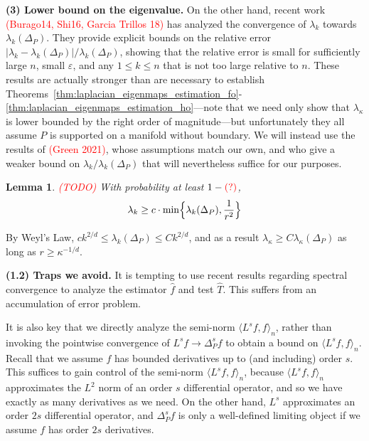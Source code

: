\documentclass{article}
\newcommand{\1}{\mathbf{1}}
\newcommand{\Leb}{L}
\newcommand{\dotp}[2]{\langle #1, #2 \rangle}
\newcommand{\wh}[1]{\widehat{#1}}
\theoremstyle{alden}
\theoremstyle{aldenthm}
\newtheorem{lemma}{Lemma}
\theoremstyle{definition}
\theoremstyle{remark}
\begin{document}
\textbf{(3) Lower bound on the eigenvalue.} On the other hand, recent work \textcolor{red}{(Burago14, Shi16, Garcia Trillos 18)} has analyzed the convergence of $\lambda_{k}$ towards $\lambda_{k}(\Delta_P)$. They provide explicit bounds on the relative error $|\lambda_{k} - \lambda_{k}(\Delta_P)|/\lambda_{k}(\Delta_P)$, showing that the relative error is small for sufficiently large $n$, small $\varepsilon$, and any $1 \leq k \leq n$ that is not too large relative to $n$. These results are actually stronger than are necessary to establish Theorems~\ref{thm:laplacian_eigenmaps_estimation_fo}-\ref{thm:laplacian_eigenmaps_estimation_ho}---note that we need only show that $\lambda_{\kappa}$ is lower bounded by the right order of magnitude---but unfortunately they all assume $P$ is supported on a manifold without boundary. We will instead use the results of \textcolor{red}{(Green 2021)}, whose assumptions match our own, and who give a weaker bound on $\lambda_k/\lambda_k(\Delta_P)$ that will nevertheless suffice for our purposes. 

\begin{lemma}
	\textcolor{red}{(TODO)}
	With probability at least $1 - \textcolor{red}{(?)}$,
	\begin{equation*}
	\lambda_k \geq c \cdot \min\Bigl\{\lambda_k(\Delta_P), \frac{1}{r^{2}} \Bigr\}
	\end{equation*}
\end{lemma}
By Weyl's Law, $c k^{2/d} \leq \lambda_{k}(\Delta_P) \leq Ck^{2/d}$, and as a result $\lambda_{\kappa} \geq C\lambda_{\kappa}(\Delta_P)$ as long as $r \geq \kappa^{-1/d}$. 

\textbf{(1.2) Traps we avoid.} It is tempting to use recent results regarding spectral convergence to analyze the estimator $\wh{f}$ and test $\wh{T}$. This suffers from an accumulation of error problem. 

It is also key that we directly analyze the semi-norm $\dotp{L^s f}{f}_n$, rather than invoking the pointwise convergence of $L^{s}f \to \Delta_P^{s}f$ to obtain a bound on $\dotp{L^s f}{f}_n$. Recall that we assume $f$ has bounded derivatives up to (and including) order $s$. This suffices to gain control of the semi-norm $\dotp{L^s f}{f}_n$, because $\dotp{L^s f}{f}_n$ approximates the $\Leb^2$ norm of an order $s$ differential operator, and so we have exactly as many derivatives as we need. On the other hand, $L^s$ approximates an order $2s$ differential operator, and $\Delta_P^sf$ is only a well-defined limiting object if we assume $f$ has order $2s$ derivatives. 
\end{document}
